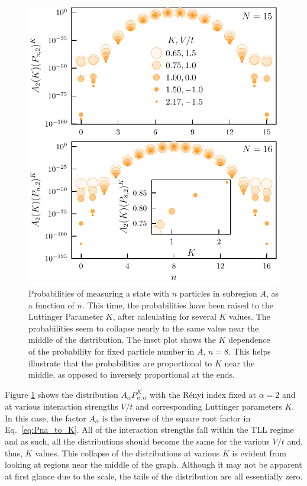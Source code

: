 \begin{figure}[h!]
\begin{center}
\includegraphics[scale=1.0]{Images/TLLCollapse.pdf}
\end{center}
\caption{Probabilities of measuring a state with $n$ particles in subregion $A$, as  a function of $n$. This time, the probabilities have been raised to the Luttinger Parameter $K$, after calculating for several $K$ values. The probabilities seem to collapse nearly to the same value near the middle of the distribution. The inset plot shows the $K$ dependence of the probability for fixed particle number in $A$, $n=8$. This helps illustrate that the probabilities are proportional to $K$ near the middle, as opposed to inversely proportional at the ends.}
\label{fig:K_collapse}
\end{figure}
 
Figure \ref{fig:K_collapse} shows the distribution $A_{\alpha} P_{n,\alpha}^{K}$ with the R\'enyi index fixed at $\alpha=2$ and at various interaction strengths $V/t$ and corresponding Luttinger parameters $K$. In this case, the factor $A_{\alpha}$ is the inverse of the square root factor in Eq.~\eqref{eq:Pna_to_K}. All of the interaction strengths fall within the TLL regime and as such, all the distributions should become the same for the various $V/t$ and, thus, $K$ values. This collapse of the distributions at various $K$ is evident from looking at regions near the middle of the graph. Although it may not be apparent at first glance due to the scale, the tails of the distribution are all essentially zero.


